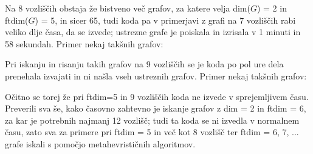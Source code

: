 \documentclass[12pt]{article}
\begin{document}

Na 8 vozliščih obstaja že bistveno več grafov, za katere velja dim($G$) = 2 in ftdim($G$) = 5, in sicer 65, 
tudi koda pa v primerjavi z grafi na 7 vozliščih rabi veliko dlje časa, da se izvede; ustrezne grafe je poiskala 
in izrisala v 1 minuti in 58 sekundah. Primer nekaj takšnih grafov: 


Pri iskanju in risanju takih grafov na 9 vozliščih se je koda po pol ure dela prenehala izvajati in ni našla 
vseh ustreznih grafov. Primer nekaj takšnih grafov:


Očitno se torej že pri ftdim=5 in 9 vozliščih koda ne izvede v sprejemljivem času. Preverili sva še, kako 
časovno zahtevno je iskanje grafov z dim = 2 in ftdim = 6, za kar je potrebnih najmanj 12 vozlišč; tudi ta 
koda se ni izvedla v normalnem času, zato sva za primere pri ftdim = 5 in več kot 8 vozlišč ter ftdim = 6, 7, ... 
grafe iskali s pomočjo metahevrističnih algoritmov. 
\end{document}
